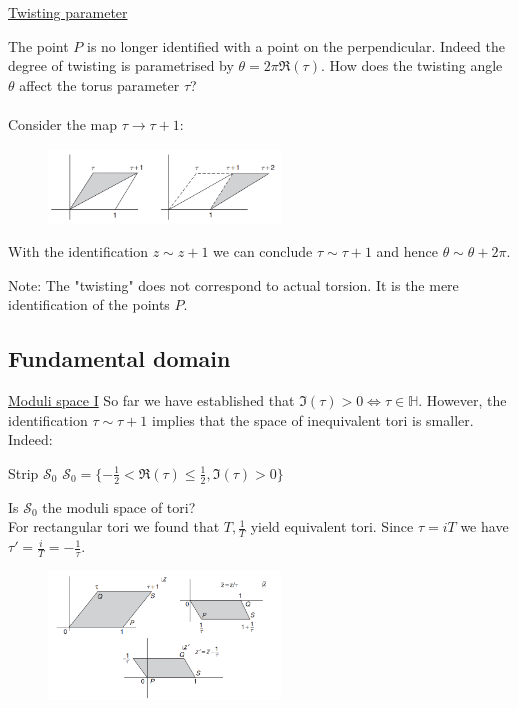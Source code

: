 \documentclass[11pt,aspectratio=169]{beamer}
\begin{document}
\begin{frame}{\underline{Twisting parameter}}

	
	The point $P$ is no longer identified with a point on the perpendicular. Indeed the degree of twisting is parametrised by $\theta = 2\pi \Re(\tau)$.
	How does the twisting angle $\theta$ affect the torus parameter $\tau$?
	\\~\\
	Consider the map $\tau \rightarrow \tau + 1$:
	\begin{figure}[htbp]
		\centering
		\includegraphics[width = 0.55\textwidth]{elements/tau map.PNG}
	\end{figure}
	With the identification $z \sim z + 1$ we can conclude $\tau \sim \tau + 1$ and hence $\theta \sim \theta + 2\pi$.
	\begin{block}{Note:}
		The "twisting" does not correspond to actual torsion. It is the mere identification of the points $P$.
	\end{block}
\end{frame}

\subsection{Fundamental domain}
\begin{frame}{\underline{Moduli space I}}
	So far we have established that $\Im(\tau) > 0 \Leftrightarrow \tau \in \mathbb{H}$.
	However, the identification $\tau \sim \tau + 1$ implies that the space of inequivalent tori is smaller. Indeed:
	\begin{block}{Strip $\mathcal{S}_{0}$}
		$\mathcal{S}_{0} = \{-\frac{1}{2} < \Re(\tau) \leq \frac{1}{2}, \Im(\tau) > 0\}$
	\end{block}
	Is $\mathcal{S}_{0}$ the moduli space of tori?
	\\
	For rectangular tori we found that $T, \frac{1}{T}$ yield equivalent tori. Since $\tau = iT$ we have $\tau' = \frac{i}{T} = -\frac{1}{\tau}$.
	\begin{figure}[htbp]
		\centering
		\includegraphics[width = 0.55\textwidth]{elements/s module trans.PNG}
	\end{figure}
\end{frame}
\end{document}
